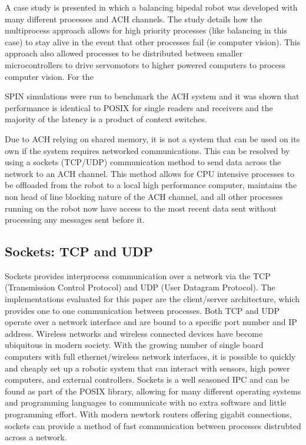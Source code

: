 A case study is presented \cite{REALTIMEACH} in which a balancing bipedal robot was developed with many different processes and ACH channels. The study details how the multiprocess approach allows for high priority processes (like balancing in this case) to stay alive in the event that other processes fail (ie computer vision). This approach also allowed processes to be distributed between smaller microcontrollers to drive servomotors to higher powered computers to process computer vision. For the 

SPIN simulations were run to benchmark the ACH system and it was shown that performance is identical to POSIX for single readers and receivers and the majority of the latency is a product of context switches. 

Due to ACH relying on shared memory, it is not a system that can be used on its own if the system requires networked communications. This can be resolved by using a sockets (TCP/UDP) communication method to send data across the network to an ACH channel\cite{ACHHUBO}. This method allows for CPU intensive processes to be offloaded from the robot to a local high performance computer, maintains the non head of line blocking nature of the ACH channel, and all other processes running on the robot now have access to the most recent data sent without processing any messages sent before it.

\subsection{Sockets: TCP and UDP}

Sockets provides interprocess communication over a network via the TCP (Transmission Control Protocol) and UDP (User Datagram Protocol). The implementations evaluated for this paper are the client/server  architecture, which provides one to one communication between processes. Both TCP and UDP operate over a network interface and are bound to a specific port number and IP address. Wireless networks and wireless connected devices have become ubiquitous in modern society. With the growing number of single board computers with full ethernet/wireless network interfaces, it is possible to quickly and cheaply set up a robotic system that can interact with sensors, high power computers, and external controllers. Sockets is a well seasoned IPC and can be found as part of the POSIX library, allowing for many different operating systems and programming languages to communicate with no extra software and little programming effort. With modern newtork routers offering gigabit connections, sockets can provide a method of fast communication between processes distrubted across a network. 

